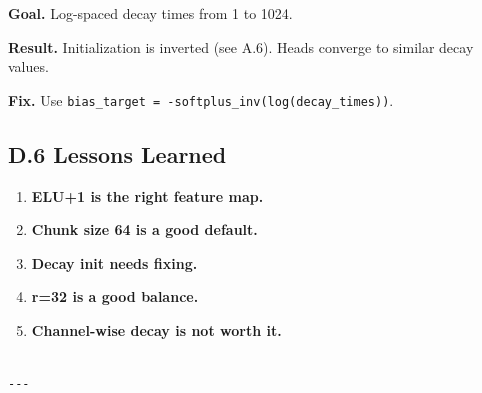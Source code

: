 \textbf{Goal.} Log-spaced decay times from 1 to 1024.

\textbf{Result.} Initialization is inverted (see A.6). Heads converge to 
similar decay values.

\textbf{Fix.} Use \texttt{bias\_target = -softplus\_inv(log(decay\_times))}.

\subsection{D.6 Lessons Learned}

\begin{enumerate}
\item \textbf{ELU+1 is the right feature map.}
\item \textbf{Chunk size 64 is a good default.}
\item \textbf{Decay init needs fixing.}
\item \textbf{r=32 is a good balance.}
\item \textbf{Channel-wise decay is not worth it.}
\end{enumerate}
\begin{lstlisting}

---
\end{lstlisting}